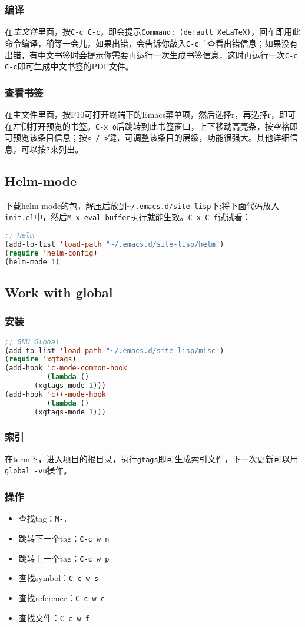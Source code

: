\subsubsection{编译}
\label{sec:auctex-compile}
在\emph{主文件}里面，按\verb|C-c C-c|，即会提示\verb|Command: (default XeLaTeX)|，回车即用此命令编译，稍等一会儿，如果出错，会告诉你敲入\verb|C-c `|查看出错信息；如果没有出错，有中文书签时会提示你需要再运行一次生成书签信息，这时再运行一次\verb|C-c C-c|即可生成中文书签的PDF文件。
\subsubsection{查看书签}
\label{sec:auctex-view-toc}
在主文件里面，按F10可打开终端下的Emacs菜单项，然后选择r，再选择r，即可在左侧打开预览的书签。\verb|C-x o|后跳转到此书签窗口，上下移动高亮条，按空格即可预览该条目信息；按\verb|< / >|键，可调整该条目的层级，功能很强大。其他详细信息，可以按\verb|?|来列出。

\subsection{Helm-mode}
\label{sec:helm-mode}
下载helm-mode的包，解压后放到\verb|~/.emacs.d/site-lisp|下;将下面代码放入\verb|init.el|中，然后\verb|M-x eval-buffer|执行就能生效。\verb|C-x C-f|试试看：
\begin{lstlisting}[language={lisp},label=helm-mode,caption=安装helm-mode]
;; Helm
(add-to-list 'load-path "~/.emacs.d/site-lisp/helm")
(require 'helm-config)
(helm-mode 1)
\end{lstlisting}

\subsection{Work with global}
\label{part:work-with-global}

\subsubsection{安装}
\begin{lstlisting}[language={lisp},label=xgtags-mode,caption=安装xgtags-mode]
;; GNU Global
(add-to-list 'load-path "~/.emacs.d/site-lisp/misc")
(require 'xgtags)
(add-hook 'c-mode-common-hook
          (lambda ()
       (xgtags-mode 1)))
(add-hook 'c++-mode-hook
          (lambda ()
       (xgtags-mode 1)))
\end{lstlisting}

\subsubsection{索引}
在term下，进入项目的根目录，执行\verb|gtags|即可生成索引文件，下一次更新可以用\verb|global -vu|操作。
\subsubsection{操作}
\begin{itemize}
\item 查找tag：\verb|M-.|
\item 跳转下一个tag：\verb|C-c w n|
\item 跳转上一个tag：\verb|C-c w p|
\item 查找symbol：\verb|C-c w s|
\item 查找reference：\verb|C-c w c|
\item 查找文件：\verb|C-c w f|
\end{itemize}


